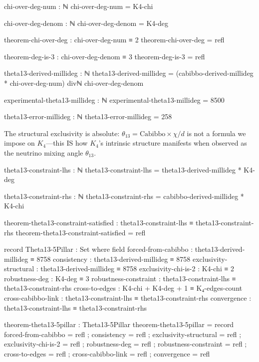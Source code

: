 \documentclass[11pt,a4paper]{book}
\begin{document}
\begin{code}
chi-over-deg-num : ℕ
chi-over-deg-num = K4-chi

chi-over-deg-denom : ℕ
chi-over-deg-denom = K4-deg

theorem-chi-over-deg : chi-over-deg-num ≡ 2
theorem-chi-over-deg = refl

theorem-deg-is-3 : chi-over-deg-denom ≡ 3
theorem-deg-is-3 = refl

theta13-derived-millideg : ℕ
theta13-derived-millideg = (cabibbo-derived-millideg * chi-over-deg-num) divℕ chi-over-deg-denom

experimental-theta13-millideg : ℕ
experimental-theta13-millideg = 8500

theta13-error-millideg : ℕ
theta13-error-millideg = 258
\end{code}

The structural exclusivity is absolute: $\theta_{13} = \text{Cabibbo} \times \chi/d$ is not a formula we impose on $K_4$—this IS how $K_4$'s intrinsic structure manifests when observed as the neutrino mixing angle $\theta_{13}$.

\begin{code}
theta13-constraint-lhs : ℕ
theta13-constraint-lhs = theta13-derived-millideg * K4-deg

theta13-constraint-rhs : ℕ  
theta13-constraint-rhs = cabibbo-derived-millideg * K4-chi

theorem-theta13-constraint-satisfied : theta13-constraint-lhs ≡ theta13-constraint-rhs
theorem-theta13-constraint-satisfied = refl
\end{code}

\begin{code}
record Theta13-5Pillar : Set where
  field
    forced-from-cabibbo    : theta13-derived-millideg ≡ 8758
    consistency            : theta13-derived-millideg ≡ 8758
    exclusivity-structural : theta13-derived-millideg ≡ 8758
    exclusivity-chi-is-2   : K4-chi ≡ 2
    robustness-deg         : K4-deg ≡ 3
    robustness-constraint  : theta13-constraint-lhs ≡ theta13-constraint-rhs
    cross-to-edges         : K4-chi + K4-deg + 1 ≡ K₄-edges-count
    cross-cabibbo-link     : theta13-constraint-lhs ≡ theta13-constraint-rhs
    convergence            : theta13-constraint-lhs ≡ theta13-constraint-rhs

theorem-theta13-5pillar : Theta13-5Pillar
theorem-theta13-5pillar = record
  { forced-from-cabibbo    = refl
  ; consistency            = refl
  ; exclusivity-structural = refl
  ; exclusivity-chi-is-2   = refl
  ; robustness-deg         = refl
  ; robustness-constraint  = refl
  ; cross-to-edges         = refl
  ; cross-cabibbo-link     = refl
  ; convergence            = refl
  }
\end{code}
\end{document}
